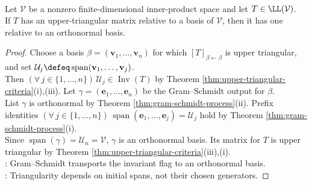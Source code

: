 \begin{corollary} \label{cor:upper-triangular-orthonormal-basis} \\
Let $\mathcal{V}$ be a nonzero finite-dimensional inner-product space and let $T\in\LL(\mathcal{V})$.\\
If $T$ has an upper-triangular matrix relative to a basis of $\mathcal{V}$, then it has one relative to an orthonormal basis.
\begin{proof}
Choose a basis $\beta=(\mathbf{v}_1,\ldots,\mathbf{v}_n)$ for which $[T]_{\beta\leftarrow\beta}$ is upper triangular, and set $\mathcal{U}_j\defeq\operatorname{span}(\mathbf{v}_1,\ldots,\mathbf{v}_j)$.\\
Then $(\forall\,j\in\{1,\ldots,n\})\,\mathcal{U}_j\in\operatorname{Inv}(T)$ by Theorem \ref{thm:upper-triangular-criteria}(i),(iii). Let $\gamma=(\mathbf{e}_1,\ldots,\mathbf{e}_n)$ be the Gram--Schmidt output for $\beta$.\\
List $\gamma$ is orthonormal by Theorem \ref{thm:gram-schmidt-process}(ii). Prefix identities $(\forall\,j\in\{1,\ldots,n\})\,\operatorname{span}(\mathbf{e}_1,\ldots,\mathbf{e}_j)=\mathcal{U}_j$ hold by Theorem \ref{thm:gram-schmidt-process}(i).\\
Since $\operatorname{span}(\gamma)=\mathcal{U}_n=\mathcal{V}$, $\gamma$ is an orthonormal basis. Its matrix for $T$ is upper triangular by Theorem \ref{thm:upper-triangular-criteria}(iii),(i).\\
: Gram--Schmidt transports the invariant flag to an orthonormal basis.\\
: Triangularity depends on initial spans, not their chosen generators.
\end{proof}
\end{corollary}


